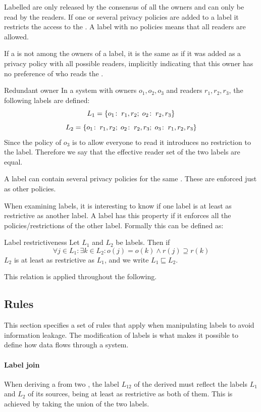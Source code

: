 Labelled \xvalues{} are only released by the consensus of all the owners and can only be read by the readers.
If one or several privacy policies are added to a label it restricts the access to the \xvalue{}.
A label with no policies  means that all readers are allowed.

If a \principal{} is not among the owners of a label, it is the same as if it was added as a privacy policy with all possible readers, implicitly indicating that this owner has no preference of who reads the \xvalue{}.

\begin{example}{Redundant owner}
In a system with owners $o_1, o_2, o_3$ and readers $r_1, r_2, r_3$, the following labels are defined:
$$L_1 = \{o_1\!:\;r_1,r_2;\; o_2\!:\;r_2, r_3\}$$
$$L_2 = \{o_1\!:\;r_1,r_2;\; o_2\!:\;r_2, r_3;\; o_3\!:\;r_1, r_2, r_3\}$$
Since the policy of $o_3$ is to allow everyone to read it introduces no restriction to the label.
Therefore we say that the effective reader set of the two labels are equal.
\end{example}

A label can contain several privacy policies for the same \principal{}.
These are enforced just as other policies.

When examining labels, it is interesting to know if one label is at least as restrictive as another label.
A label has this property if it enforces all the policies/restrictions of the other label.
Formally this can be defined as:

\begin{definition}{Label restrictiveness}\label{dlm:def:restrict}
  Let $L_1$ and $L_2$ be labels.
  Then if
  $$\forall j \in L_1 : \exists k \in L_2 : o(j) = o(k) \wedge r(j) \supseteq r(k)$$
  $L_2$ is at least as restrictive as $L_1$, and we write $L_1 \sqsubseteq L_2$.
\end{definition}

This relation is applied throughout the following.

\subsection{Rules}
This section specifies a set of rules that apply when manipulating labels to avoid information leakage.
The modification of labels is what makes it possible to define how data flows through a system.

\paragraph{Label join}
When deriving a \xvalue{} from two \xvalues{}, the label $L_{12}$ of the derived \xvalue{} must reflect the labels $L_1$ and $L_2$ of its sources, being at least as restrictive as both of them.
This is achieved by taking the union of the two labels.

